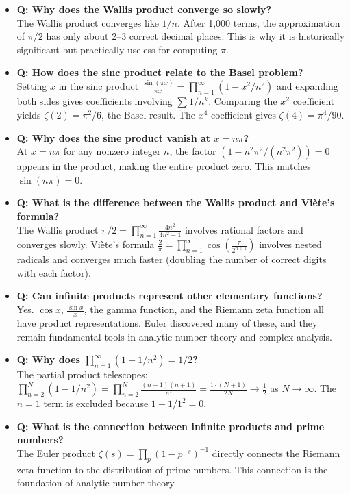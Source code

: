 \begin{itemize}
\item \textbf{Q: Why does the Wallis product converge so slowly?} \\
The Wallis product converges like $1/n$. After 1,000 terms, the approximation of $\pi/2$ has only about 2--3 correct decimal places. This is why it is historically significant but practically useless for computing $\pi$.

\item \textbf{Q: How does the sinc product relate to the Basel problem?} \\
Setting $x$ in the sinc product $\frac{\sin(\pi x)}{\pi x} = \prod_{n=1}^{\infty} (1 - x^2/n^2)$ and expanding both sides gives coefficients involving $\sum 1/n^k$. Comparing the $x^2$ coefficient yields $\zeta(2) = \pi^2/6$, the Basel result. The $x^4$ coefficient gives $\zeta(4) = \pi^4/90$.

\item \textbf{Q: Why does the sine product vanish at $x = n\pi$?} \\
At $x = n\pi$ for any nonzero integer $n$, the factor $(1 - n^2\pi^2/(n^2\pi^2)) = 0$ appears in the product, making the entire product zero. This matches $\sin(n\pi) = 0$.

\item \textbf{Q: What is the difference between the Wallis product and Vi\`{e}te's formula?} \\
The Wallis product $\pi/2 = \prod_{n=1}^{\infty} \frac{4n^2}{4n^2-1}$ involves rational factors and converges slowly. Vi\`{e}te's formula $\frac{2}{\pi} = \prod_{n=1}^{\infty} \cos(\frac{\pi}{2^{n+1}})$ involves nested radicals and converges much faster (doubling the number of correct digits with each factor).

\item \textbf{Q: Can infinite products represent other elementary functions?} \\
Yes. $\cos x$, $\frac{\sin x}{x}$, the gamma function, and the Riemann zeta function all have product representations. Euler discovered many of these, and they remain fundamental tools in analytic number theory and complex analysis.

\item \textbf{Q: Why does $\prod_{n=1}^{\infty} (1 - 1/n^2) = 1/2$?} \\
The partial product telescopes: $\prod_{n=2}^N (1 - 1/n^2) = \prod_{n=2}^N \frac{(n-1)(n+1)}{n^2} = \frac{1 \cdot (N+1)}{2N} \to \frac{1}{2}$ as $N \to \infty$. The $n=1$ term is excluded because $1 - 1/1^2 = 0$.

\item \textbf{Q: What is the connection between infinite products and prime numbers?} \\
The Euler product $\zeta(s) = \prod_p (1 - p^{-s})^{-1}$ directly connects the Riemann zeta function to the distribution of prime numbers. This connection is the foundation of analytic number theory.
\end{itemize}

